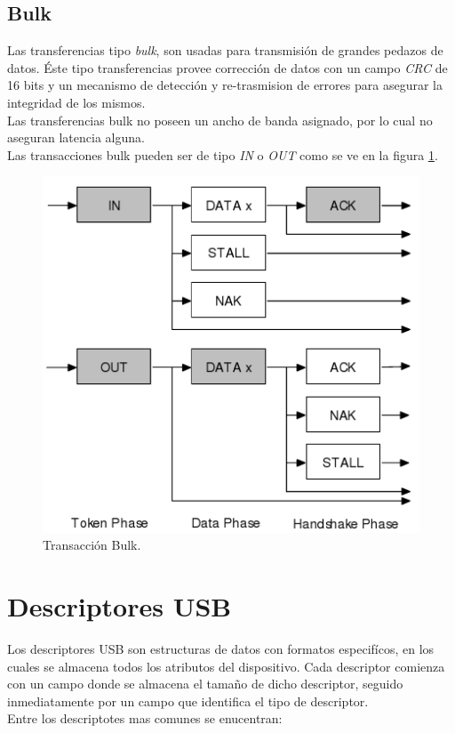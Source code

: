 \subsection{Bulk}
Las transferencias tipo \emph{bulk}, son usadas para transmisi\'on de grandes
pedazos de datos. \'Este tipo transferencias provee correcci\'on de datos
con un campo \emph{CRC} de 16 bits y un mecanismo de detecci\'on y
re-trasmision de errores para asegurar la integridad de los mismos.\\

Las transferencias bulk no poseen un ancho de banda asignado, por lo cual no
aseguran latencia alguna.\\

Las transacciones bulk pueden ser de tipo \emph{IN} o \emph{OUT} como se ve en
la figura \ref{fig:usb_bulk_transaction}.

\begin{figure}[htp]
\centering
\includegraphics[scale=0.5]{./img/usb_bulk_transaction.png}
\caption{Transacci\'on Bulk.}
\label{fig:usb_bulk_transaction}
\end{figure}


\clearpage
\section{Descriptores USB}
Los descriptores USB son estructuras de datos con formatos especif\'icos, en
los cuales se almacena todos los atributos del dispositivo.
Cada descriptor comienza con un campo donde se almacena el tama\~no de dicho
descriptor, seguido inmediatamente por un campo que identifica el tipo de
descriptor.\\
Entre los descriptotes mas comunes se enucentran:


